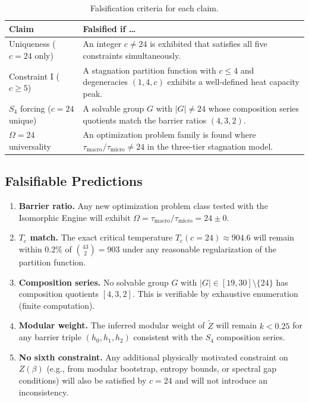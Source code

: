 \documentclass[12pt,a4paper]{article}
\theoremstyle{definition}
\theoremstyle{remark}
\newcommand{\Sfour}{S_4}
\newcommand{\Zpart}{Z(\beta)}
\begin{document}
\begin{table}[H]
\centering
\caption{Falsification criteria for each claim.}
\label{tab:falsification}
\begin{tabular}{@{}p{4cm}p{9cm}@{}}
\toprule
\textbf{Claim} & \textbf{Falsified if \ldots} \\
\midrule
Uniqueness ($c = 24$ only) & An integer $c \ne 24$ is exhibited that satisfies all five constraints simultaneously. \\
\addlinespace
Constraint I ($c \ge 5$) & A stagnation partition function with $c \le 4$ and degeneracies $(1, 4, c)$ exhibits a well-defined heat capacity peak. \\
\addlinespace
$\Sfour$ forcing ($c = 24$ unique) & A solvable group $G$ with $|G| \ne 24$ whose composition series quotients match the barrier ratios $(4, 3, 2)$. \\
\addlinespace
$\Omega = 24$ universality & An optimization problem family is found where $\tau_{\text{macro}} / \tau_{\text{micro}} \ne 24$ in the three-tier stagnation model. \\
\bottomrule
\end{tabular}
\end{table}

\subsection{Falsifiable Predictions}

\begin{enumerate}[label=\textbf{P\arabic*.}]
\item \textbf{Barrier ratio.} Any new optimization problem class tested with the Isomorphic Engine will exhibit $\Omega = \tau_{\text{macro}} / \tau_{\text{micro}} = 24 \pm 0$.

\item \textbf{$T_c$ match.} The exact critical temperature $T_c(c{=}24) \approx 904.6$ will remain within 0.2\% of $\binom{43}{2} = 903$ under any reasonable regularization of the partition function.

\item \textbf{Composition series.} No solvable group $G$ with $|G| \in [19, 30] \setminus \{24\}$ has composition quotients $[4, 3, 2]$.  This is verifiable by exhaustive enumeration (finite computation).

\item \textbf{Modular weight.} The inferred modular weight of $\tilde{Z}$ will remain $k < 0.25$ for any barrier triple $(h_0, h_1, h_2)$ consistent with the $\Sfour$ composition series.

\item \textbf{No sixth constraint.} Any additional physically motivated constraint on $\Zpart$ (e.g., from modular bootstrap, entropy bounds, or spectral gap conditions) will also be satisfied by $c = 24$ and will not introduce an inconsistency.
\end{enumerate}
\end{document}
